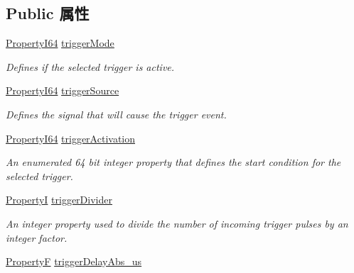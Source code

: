 \subsection*{Public 属性}
\begin{DoxyCompactItemize}
\item 
\hypertarget{classmv_i_m_p_a_c_t_1_1acquire_1_1_trigger_control_a96921f2c80161e22665bff479dba1323}{\hyperlink{group___common_interface_ga81749b2696755513663492664a18a893}{Property\+I64} \hyperlink{classmv_i_m_p_a_c_t_1_1acquire_1_1_trigger_control_a96921f2c80161e22665bff479dba1323}{trigger\+Mode}}\label{classmv_i_m_p_a_c_t_1_1acquire_1_1_trigger_control_a96921f2c80161e22665bff479dba1323}

\begin{DoxyCompactList}\small\item\em Defines if the selected trigger is active. \end{DoxyCompactList}\item 
\hyperlink{group___common_interface_ga81749b2696755513663492664a18a893}{Property\+I64} \hyperlink{classmv_i_m_p_a_c_t_1_1acquire_1_1_trigger_control_ad931c24fbfb7e09ab087387927f3caea}{trigger\+Source}
\begin{DoxyCompactList}\small\item\em Defines the signal that will cause the trigger event. \end{DoxyCompactList}\item 
\hyperlink{group___common_interface_ga81749b2696755513663492664a18a893}{Property\+I64} \hyperlink{classmv_i_m_p_a_c_t_1_1acquire_1_1_trigger_control_a285ca671cde7d936027f19781070e0cc}{trigger\+Activation}
\begin{DoxyCompactList}\small\item\em An enumerated 64 bit integer property that defines the start condition for the selected trigger. \end{DoxyCompactList}\item 
\hyperlink{group___common_interface_ga12d5e434238ca242a1ba4c6c3ea45780}{Property\+I} \hyperlink{classmv_i_m_p_a_c_t_1_1acquire_1_1_trigger_control_a53b2713eee5c3a895e772f8a2cfb0cbf}{trigger\+Divider}
\begin{DoxyCompactList}\small\item\em An integer property used to divide the number of incoming trigger pulses by an integer factor. \end{DoxyCompactList}\item 
\hypertarget{classmv_i_m_p_a_c_t_1_1acquire_1_1_trigger_control_ac084914e593ad5cba7f1f1b00ce232aa}{\hyperlink{group___common_interface_gaf54865fe5a3d5cfd15f9a111b40d09f9}{Property\+F} \hyperlink{classmv_i_m_p_a_c_t_1_1acquire_1_1_trigger_control_ac084914e593ad5cba7f1f1b00ce232aa}{trigger\+Delay\+Abs\+\_\+us}}\label{classmv_i_m_p_a_c_t_1_1acquire_1_1_trigger_control_ac084914e593ad5cba7f1f1b00ce232aa}


\end{DoxyCompactItemize}
